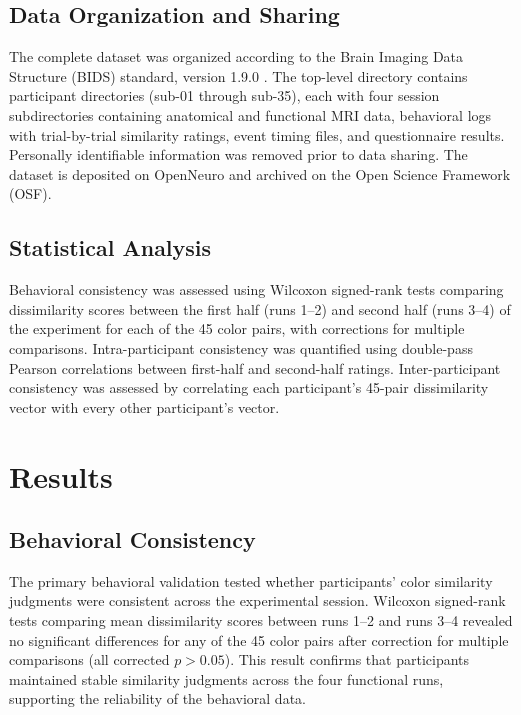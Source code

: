 \documentclass[11pt]{article}
\begin{document}
\subsection{Data Organization and Sharing}

The complete dataset was organized according to the Brain Imaging Data Structure (BIDS) standard, version 1.9.0 \citep{gorgolewski2016brain}. The top-level directory contains participant directories (sub-01 through sub-35), each with four session subdirectories containing anatomical and functional MRI data, behavioral logs with trial-by-trial similarity ratings, event timing files, and questionnaire results. Personally identifiable information was removed prior to data sharing. The dataset is deposited on OpenNeuro and archived on the Open Science Framework (OSF).

\subsection{Statistical Analysis}

Behavioral consistency was assessed using Wilcoxon signed-rank tests comparing dissimilarity scores between the first half (runs 1--2) and second half (runs 3--4) of the experiment for each of the 45 color pairs, with corrections for multiple comparisons. Intra-participant consistency was quantified using double-pass Pearson correlations between first-half and second-half ratings. Inter-participant consistency was assessed by correlating each participant's 45-pair dissimilarity vector with every other participant's vector.

\section{Results}

\subsection{Behavioral Consistency}

The primary behavioral validation tested whether participants' color similarity judgments were consistent across the experimental session. Wilcoxon signed-rank tests comparing mean dissimilarity scores between runs 1--2 and runs 3--4 revealed no significant differences for any of the 45 color pairs after correction for multiple comparisons (all corrected $p > 0.05$). This result confirms that participants maintained stable similarity judgments across the four functional runs, supporting the reliability of the behavioral data.
\end{document}
